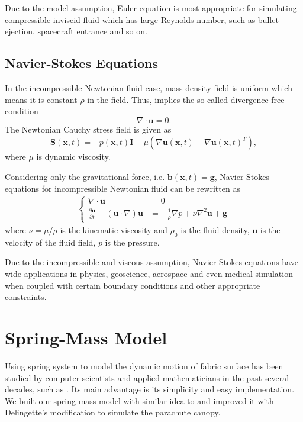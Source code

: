 Due to the model assumption, Euler equation is most appropriate for 
simulating compressible inviscid fluid which has large Reynolds number, 
such as bullet ejection, spacecraft entrance and so on.

\subsection*{Navier-Stokes Equations}
In the incompressible Newtonian fluid case, mass density field
is uniform which means it is constant $\rho$ in the field. Thus,
 implies the so-called divergence-free condition 
\begin{equation}
\nabla \cdot \mathbf{u}=0.
\end{equation}
The Newtonian Cauchy stress field is given as
\begin{equation}
\mathbf{S}(\mathbf{x},t) = -p(\mathbf{x},t) \mathbf{I} + \mu (\nabla \mathbf{u}(\mathbf{x},t) + \nabla \mathbf{u} (\mathbf{x},t)^{T}), 
\end{equation}
where $\mu$ is dynamic viscosity. 

Considering only the gravitational force, i.e. 
$\mathbf{b}(\mathbf{x},t) = \mathbf{g}$, Navier-Stokes equations for 
incompressible Newtonian fluid can be rewritten as 
\begin{eqnarray}
\left\{
\begin{aligned}
\nabla \cdot \mathbf{u} &= 0 \\
\frac{\partial \mathbf{u}}{\partial t} + (\mathbf{u} \cdot \nabla) \mathbf{u} &= -\frac{1}{\rho} \nabla p + \nu \nabla^{2} \mathbf{u} + \mathbf{g}
\end{aligned}
\right.
\label{eqn:navierstoke_eqns}
\end{eqnarray}
where $\nu = \mu / \rho$ is the kinematic viscosity and $\rho_{0}$ is the 
fluid density, $\mathbf{u}$ is the velocity of the fluid field, $p$ is the
pressure. 

Due to the incompressible and viscous assumption, Navier-Stokes
equations have wide applications in physics, geoscience, aerospace and
even medical simulation when coupled with certain boundary conditions
and other appropriate constraints.



\section{Spring-Mass Model}
\label{Section:SMM}
Using spring system to model the dynamic motion of fabric surface has been
studied by computer scientists and applied mathematicians in the past several
decades, such as \cite{Choi02,Hsiao06,Ji06,Aileni10}.
Its main advantage is its simplicity and easy implementation.
We built our spring-mass model with similar idea to \cite{Choi02} and improved
it with Delingette's modification \cite{TriangularSM} to simulate the parachute
canopy.

